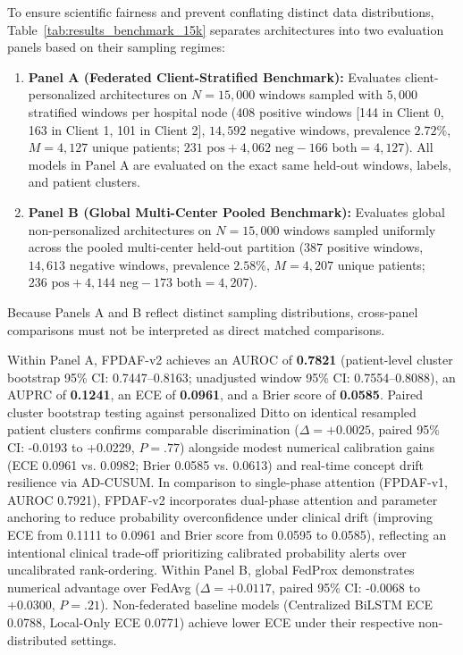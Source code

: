 \documentclass[journal,twocolumn,10pt]{IEEEtran}
\begin{document}
To ensure scientific fairness and prevent conflating distinct data distributions, Table~\ref{tab:results_benchmark_15k} separates architectures into two evaluation panels based on their sampling regimes:
\begin{enumerate}
    \item \textbf{Panel A (Federated Client-Stratified Benchmark):} Evaluates client-personalized architectures on $N=15,000$ windows sampled with $5,000$ stratified windows per hospital node ($408$ positive windows [144 in Client 0, 163 in Client 1, 101 in Client 2], $14,592$ negative windows, prevalence $2.72\%$, $M=4,127$ unique patients; $231 \text{ pos} + 4,062 \text{ neg} - 166 \text{ both} = 4,127$). All models in Panel A are evaluated on the exact same held-out windows, labels, and patient clusters.
    \item \textbf{Panel B (Global Multi-Center Pooled Benchmark):} Evaluates global non-personalized architectures on $N=15,000$ windows sampled uniformly across the pooled multi-center held-out partition ($387$ positive windows, $14,613$ negative windows, prevalence $2.58\%$, $M=4,207$ unique patients; $236 \text{ pos} + 4,144 \text{ neg} - 173 \text{ both} = 4,207$).
\end{enumerate}
Because Panels A and B reflect distinct sampling distributions, cross-panel comparisons must not be interpreted as direct matched comparisons.

Within Panel A, FPDAF-v2 achieves an AUROC of \textbf{0.7821} (patient-level cluster bootstrap 95\% CI: 0.7447--0.8163; unadjusted window 95\% CI: 0.7554--0.8088), an AUPRC of \textbf{0.1241}, an ECE of \textbf{0.0961}, and a Brier score of \textbf{0.0585}. Paired cluster bootstrap testing against personalized Ditto on identical resampled patient clusters confirms comparable discrimination ($\Delta = +0.0025$, paired 95\% CI: -0.0193 to +0.0229, $P = .77$) alongside modest numerical calibration gains (ECE 0.0961 vs. 0.0982; Brier 0.0585 vs. 0.0613) and real-time concept drift resilience via AD-CUSUM. In comparison to single-phase attention (FPDAF-v1, AUROC 0.7921), FPDAF-v2 incorporates dual-phase attention and parameter anchoring to reduce probability overconfidence under clinical drift (improving ECE from 0.1111 to 0.0961 and Brier score from 0.0595 to 0.0585), reflecting an intentional clinical trade-off prioritizing calibrated probability alerts over uncalibrated rank-ordering. Within Panel B, global FedProx demonstrates numerical advantage over FedAvg ($\Delta = +0.0117$, paired 95\% CI: -0.0068 to +0.0300, $P = .21$). Non-federated baseline models (Centralized BiLSTM ECE 0.0788, Local-Only ECE 0.0771) achieve lower ECE under their respective non-distributed settings.
\end{document}
